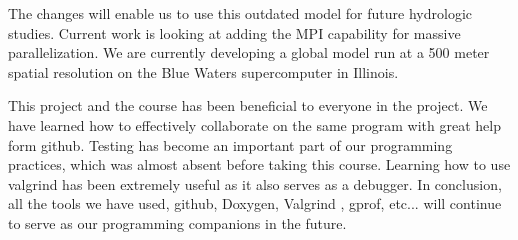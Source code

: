 \documentclass[pdftex,12pt,a4paper]{article}
\begin{document}
The changes will enable us to use this outdated model for future hydrologic studies. Current work is looking at adding the MPI capability for massive parallelization. We are currently developing a global model run at a 500 meter spatial resolution on the Blue Waters supercomputer in Illinois. 

This project and the course has been beneficial to everyone in the project. We have learned how to effectively collaborate on the same program with great help form github. Testing has become an important part of our programming practices, which was almost absent before taking this course. Learning how to use valgrind has been extremely useful as it also serves as a debugger. In conclusion, all the tools we have used, github, Doxygen, Valgrind , gprof, etc... will continue to serve as our programming companions in the future.
\end{document}
